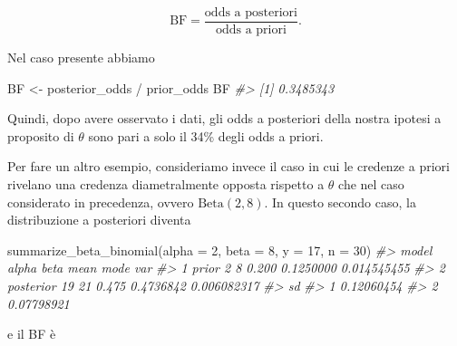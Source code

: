 \documentclass[
  11pt,
  italian,
  a4paper,
  extrafontsizes,onecolumn,openright
  ]{memoir}
\newenvironment{Shaded}{\begin{snugshade}}{\end{snugshade}}
\newcommand{\AttributeTok}[1]{\textcolor[rgb]{0.77,0.63,0.00}{#1}}
\newcommand{\CommentTok}[1]{\textcolor[rgb]{0.56,0.35,0.01}{\textit{#1}}}
\newcommand{\DecValTok}[1]{\textcolor[rgb]{0.00,0.00,0.81}{#1}}
\newcommand{\FunctionTok}[1]{\textcolor[rgb]{0.00,0.00,0.00}{#1}}
\newcommand{\NormalTok}[1]{#1}
\newcommand{\OtherTok}[1]{\textcolor[rgb]{0.56,0.35,0.01}{#1}}
\newcommand{\SpecialCharTok}[1]{\textcolor[rgb]{0.00,0.00,0.00}{#1}}
\begin{document}
\[
\text{BF} = \frac{\text{odds a posteriori}}{\text{odds a priori}}.
\]

\noindent
Nel caso presente abbiamo

\begin{Shaded}
\begin{Highlighting}[]
\NormalTok{BF }\OtherTok{\textless{}{-}}\NormalTok{ posterior\_odds }\SpecialCharTok{/}\NormalTok{ prior\_odds}
\NormalTok{BF}
\CommentTok{\#\textgreater{} [1] 0.3485343}
\end{Highlighting}
\end{Shaded}

Quindi, dopo avere osservato i dati, gli odds a posteriori della nostra ipotesi a proposito di \(\theta\) sono pari a solo il 34\% degli odds a priori.

Per fare un altro esempio, consideriamo invece il caso in cui le credenze a priori rivelano una credenza diametralmente opposta rispetto a \(\theta\) che nel caso considerato in precedenza, ovvero \(\mbox{Beta}(2, 8)\). In questo secondo caso, la distribuzione a posteriori diventa

\begin{Shaded}
\begin{Highlighting}[]
\FunctionTok{summarize\_beta\_binomial}\NormalTok{(}\AttributeTok{alpha =} \DecValTok{2}\NormalTok{, }\AttributeTok{beta =} \DecValTok{8}\NormalTok{, }\AttributeTok{y =} \DecValTok{17}\NormalTok{, }\AttributeTok{n =} \DecValTok{30}\NormalTok{)}
\CommentTok{\#\textgreater{}       model alpha beta  mean      mode         var}
\CommentTok{\#\textgreater{} 1     prior     2    8 0.200 0.1250000 0.014545455}
\CommentTok{\#\textgreater{} 2 posterior    19   21 0.475 0.4736842 0.006082317}
\CommentTok{\#\textgreater{}           sd}
\CommentTok{\#\textgreater{} 1 0.12060454}
\CommentTok{\#\textgreater{} 2 0.07798921}
\end{Highlighting}
\end{Shaded}

\noindent
e il BF è
\end{document}
